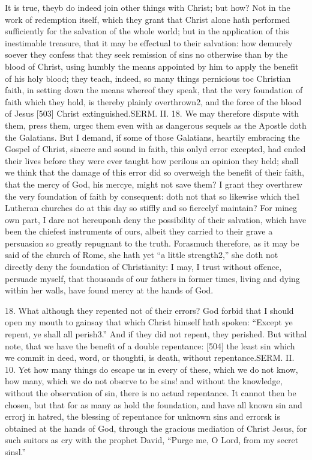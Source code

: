 It is true, theyb do indeed join other things with Christ; but how? Not in the work of redemption itself, which they grant that Christ alone hath performed sufficiently for the salvation of the whole world; but in the application of this inestimable treasure, that it may be effectual to their salvation: how demurely soever they confess that they seek remission of sins no otherwise than by the blood of Christ, using humbly the means appointed by him to apply the benefit of his holy blood; they teach, indeed, so many things pernicious toc Christian faith, in setting down the means whereof they speak, that the very foundation of faith which they hold, is thereby plainly overthrown2, and the force of the blood of Jesus [503] Christ extinguished.SERM. II. 18. We may therefore dispute with them, press them, urgec them even with as dangerous sequels as the Apostle doth the Galatians. But I demand, if some of those Galatians, heartily embracing the Gospel of Christ, sincere and sound in faith, this onlyd error excepted, had ended their lives before they were ever taught how perilous an opinion they held; shall we think that the damage of this error did so overweigh the benefit of their faith, that the mercy of God, his mercye, might not save them? I grant they overthrew the very foundation of faith by consequent: doth not that so likewise which the1 Lutheran churches do at this day so stiffly and so fiercelyf maintain? For mineg own part, I dare not hereuponh deny the possibility of their salvation, which have been the chiefest instruments of ours, albeit they carried to their grave a persuasion so greatly repugnant to the truth. Forasmuch therefore, as it may be said of the church of Rome, she hath yet “a little strength2,” she doth not directly deny the foundation of Christianity: I may, I trust without offence, persuade myself, that thousands of our fathers in former times, living and dying within her walls, have found mercy at the hands of God.

18. What although they repented not of their errors? God forbid that I should open my mouth to gainsay that which Christ himself hath spoken: “Except ye repent, ye shall all perish3.” And if they did not repent, they perished. But withal note, that we have the benefit of a double repentance: [504] the least sin which we commit in deed, word, or thoughti, is death, without repentance.SERM. II. 10. Yet how many things do escape us in every of these, which we do not know, how many, which we do not observe to be sins! and without the knowledge, without the observation of sin, there is no actual repentance. It cannot then be chosen, but that for as many as hold the foundation, and have all known sin and errorj in hatred, the blessing of repentance for unknown sins and errorsk is obtained at the hands of God, through the gracious mediation of Christ Jesus, for such suitors as cry with the prophet David, “Purge me, O Lord, from my secret sinsl.”


